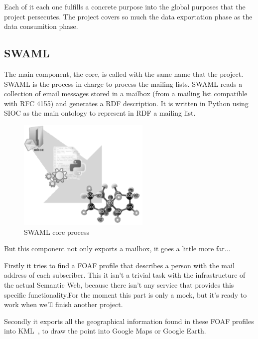 \documentclass{llncs}
\begin{document}
Each of it each one fulfills a concrete purpose into the global purposes 
that the project persecutes. The project covers so much the data exportation 
phase as the data consumition phase.

\subsection{SWAML}

The main component, the core, is called with the same name that the project. 
SWAML is the process in charge to process the mailing lists. SWAML reads a 
collection of email messages stored in a mailbox (from a mailing list 
compatible with RFC 4155) and generates a RDF description. It is written in 
Python using SIOC as the main ontology to represent in RDF a mailing list.

\begin{figure}[ht]
 \centering
 \includegraphics[bb=0 0 238 200]{images/swaml-process.png}
 \caption{SWAML core process}
\end{figure}

But this component not only exports a mailbox, it goes a little more far...

Firstly it tries to find a FOAF profile that describes a person with the 
mail address of each subscriber. This it isn't a trivial task with the 
infrastructure of the actual Semantic Web, because there isn't any service 
that provides this specific functionality.For the moment this part is only 
a mock, but it's ready to work when we'll finish another project.

Secondly it exports all the geographical information found in these FOAF 
profiles into KML~\cite{Ricket2006}, to draw the point into Google Maps or 
Google Earth.
\end{document}
